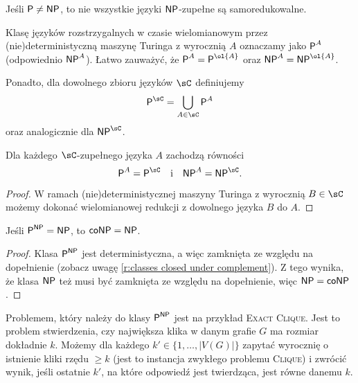 \begin{theorem}
    Jeśli $\textsf{P} \neq \textsf{NP}$, to nie wszystkie języki $\textsf{NP}$-zupełne są samoredukowalne.
\end{theorem}

Klasę języków rozstrzygalnych w czasie wielomianowym przez (nie)deterministyczną maszynę Turinga z wyrocznią $A$ oznaczamy jako $\textsf{P}^A$ (odpowiednio $\textsf{NP}^A$). Łatwo zauważyć, że $\Pclass^A = \Pclass^{\ol{A}}$ oraz $\NPclass^A = \NPclass^{\ol{A}}$.

Ponadto, dla dowolnego zbioru języków $\sC$ definiujemy
\[ \Pclass^\sC = \bigcup_{A\in\sC} \Pclass^A \]
oraz analogicznie dla $\NPclass^\sC$.

\begin{fact}
    Dla każdego $\sC$-zupełnego języka $A$ zachodzą równości
    \[ \Pclass^A = \Pclass^\sC \quad\text{i}\quad \NPclass^A = \NPclass^\sC. \]
\end{fact}
\begin{proof}
    W ramach (nie)deterministycznej maszyny Turinga z wyrocznią $B \in \sC$ możemy dokonać wielomianowej redukcji z dowolnego języka $B$ do $A$.
\end{proof}

\begin{fact}
    Jeśli $\textsf{P}^{\textsf{NP}} = \textsf{NP}$, to $\textsf{coNP} = \textsf{NP}$.
\end{fact}
\begin{proof}
    Klasa $\textsf{P}^{\textsf{NP}}$ jest deterministyczna, a więc zamknięta ze względu na dopełnienie (zobacz uwagę \ref{r:classes closed under complement}). Z tego wynika, że klasa $\textsf{NP}$ też musi być zamknięta ze względu na dopełnienie, więc $\textsf{NP} = \textsf{coNP}$.
\end{proof}

Problemem, który należy do klasy $\textsf{P}^{\textsf{NP}}$ jest na przykład \textsc{Exact Clique}. Jest to problem stwierdzenia, czy największa klika w danym grafie $G$ ma rozmiar dokładnie $k$. Możemy dla każdego $k' \in \{1, \ldots, |V(G)|\}$ zapytać wyrocznię o istnienie kliki rzędu $\geq k$ (jest to instancja zwykłego problemu \textsc{Clique}) i zwrócić wynik, jeśli ostatnie $k'$, na które odpowiedź jest twierdząca, jest równe danemu $k$.

